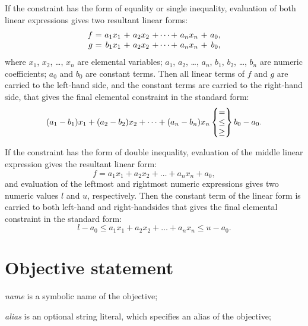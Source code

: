 \documentclass[11pt]{report}
\begin{document}
If the constraint has the form of equality or single inequality,
evaluation of both linear expressions gives two resultant linear forms:
$$\begin{array}{r@{\ }c@{\ }r@{\ }c@{\ }r@{\ }c@{\ }r@{\ }c@{\ }r}
f&=&a_1x_1&+&a_2x_2&+\dots+&a_nx_n&+&a_0,\\
g&=&b_1x_1&+&a_2x_2&+\dots+&a_nx_n&+&b_0,\\
\end{array}$$
where $x_1$, $x_2$, \dots, $x_n$ are elemental variables; $a_1$, $a_2$,
\dots, $a_n$, $b_1$, $b_2$, \dots, $b_n$ are numeric coefficients;
$a_0$ and $b_0$ are constant terms. Then all linear terms of $f$ and
$g$ are carried to the left-hand side, and the constant terms are
carried to the right-hand side, that gives the final elemental
constraint in the standard form:
$$(a_1-b_1)x_1+(a_2-b_2)x_2+\dots+(a_n-b_n)x_n\left\{
\begin{array}{@{}c@{}}=\\\leq\\\geq\\\end{array}\right\}b_0-a_0.$$

If the constraint has the form of double inequality, evaluation of the
middle linear expression gives the resultant linear form:
$$f=a_1x_1+a_2x_2+\dots+a_nx_n+a_0,$$
and evaluation of the leftmost and rightmost numeric expressions gives
two numeric values $l$ and $u$, respectively. Then the constant term of
the linear form is carried to both left-hand and right-handsides that
gives the final elemental constraint in the standard form:
$$l-a_0\leq a_1x_1+a_2x_2+\dots+a_nx_n\leq u-a_0.$$

\section{Objective statement}

\noindent
{}

\medskip

\noindent
{\it name} is a symbolic name of the objective;

\noindent
{\it alias} is an optional string literal, which specifies an alias of
the objective;
\end{document}
